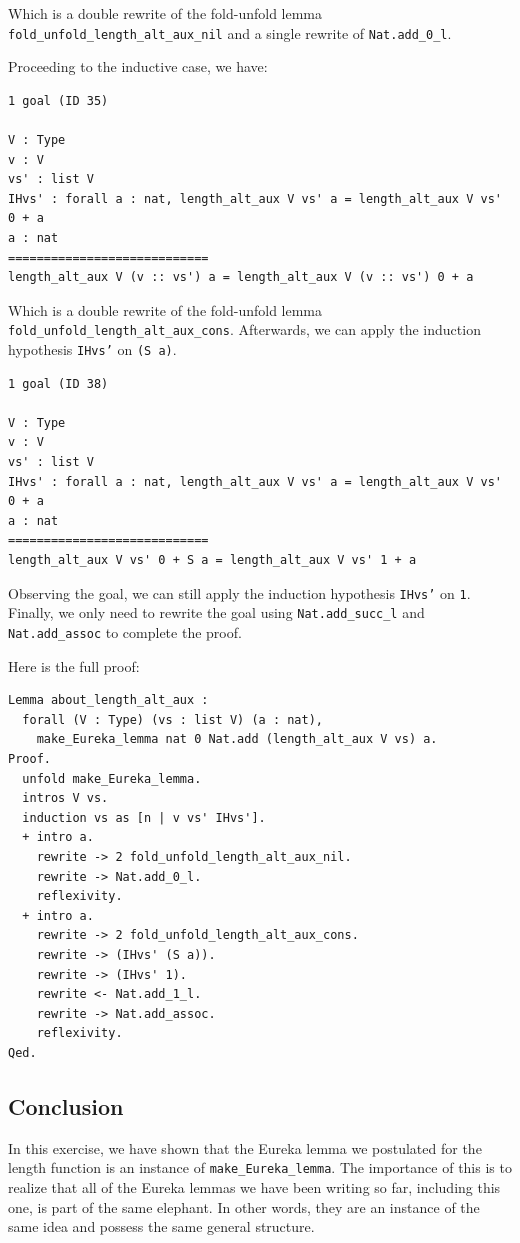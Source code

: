 \documentclass{article}
\begin{document}
Which is a double rewrite of the fold-unfold lemma \texttt{fold\_unfold\_length\_alt\_aux\_nil} and a single rewrite of \texttt{Nat.add\_0\_l}.

Proceeding to the inductive case, we have:

\begin{lstlisting}
1 goal (ID 35)

V : Type
v : V
vs' : list V
IHvs' : forall a : nat, length_alt_aux V vs' a = length_alt_aux V vs' 0 + a
a : nat
============================
length_alt_aux V (v :: vs') a = length_alt_aux V (v :: vs') 0 + a
\end{lstlisting}

Which is a double rewrite of the fold-unfold lemma \texttt{fold\_unfold\_length\_alt\_aux\_cons}. Afterwards, we can apply the induction hypothesis \texttt{IHvs'} on \texttt{(S a)}. 

\begin{lstlisting}
1 goal (ID 38)

V : Type
v : V
vs' : list V
IHvs' : forall a : nat, length_alt_aux V vs' a = length_alt_aux V vs' 0 + a
a : nat
============================
length_alt_aux V vs' 0 + S a = length_alt_aux V vs' 1 + a
\end{lstlisting}

Observing the goal, we can still apply the induction hypothesis \texttt{IHvs'} on \texttt{1}. Finally, we only need to rewrite the goal using \texttt{Nat.add\_succ\_l} and \texttt{Nat.add\_assoc} to complete the proof.

Here is the full proof:

\begin{lstlisting}
Lemma about_length_alt_aux :
  forall (V : Type) (vs : list V) (a : nat),
    make_Eureka_lemma nat 0 Nat.add (length_alt_aux V vs) a.
Proof.
  unfold make_Eureka_lemma.
  intros V vs.
  induction vs as [n | v vs' IHvs'].
  + intro a.
    rewrite -> 2 fold_unfold_length_alt_aux_nil.
    rewrite -> Nat.add_0_l.
    reflexivity.
  + intro a.
    rewrite -> 2 fold_unfold_length_alt_aux_cons.
    rewrite -> (IHvs' (S a)).
    rewrite -> (IHvs' 1).
    rewrite <- Nat.add_1_l.
    rewrite -> Nat.add_assoc.
    reflexivity.
Qed.
\end{lstlisting}

\subsection{Conclusion}

In this exercise, we have shown that the Eureka lemma we postulated for the length function is an instance of \texttt{make\_Eureka\_lemma}. The importance of this is to realize that all of the Eureka lemmas we have been writing so far, including this one, is part of the same elephant. In other words, they are an instance of the same idea and possess the same general structure.
\end{document}
